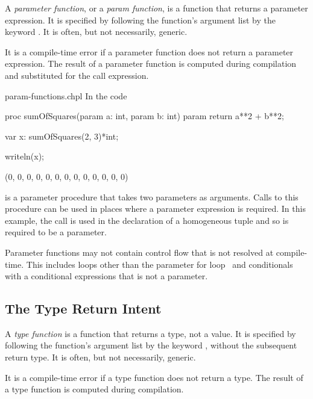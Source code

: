 A \emph{parameter function}, or a \emph{param function}, is a function that
returns a parameter expression.  It is specified by following the function's
argument list by the keyword .  It is often, but not necessarily,
generic.

It is a compile-time error if a parameter function does not return a
parameter expression.  The result of a parameter function is computed
during compilation and substituted for the call expression.

\begin{chapelexample}{param-functions.chpl}
In the code
\begin{chapel}
proc sumOfSquares(param a: int, param b: int) param
  return a**2 + b**2;

var x: sumOfSquares(2, 3)*int;
\end{chapel}
\begin{chapelpost}
writeln(x);
\end{chapelpost}
\begin{chapeloutput}
(0, 0, 0, 0, 0, 0, 0, 0, 0, 0, 0, 0, 0)
\end{chapeloutput}
 is a parameter procedure that takes
two parameters as arguments.  Calls to this procedure can be used in
places where a parameter expression is required.  In this example, the
call is used in the declaration of a homogeneous tuple and so is
required to be a parameter.
\end{chapelexample}

Parameter functions may not contain control flow that is not resolved
at compile-time.  This includes loops other than the parameter for
loop~ and conditionals with a conditional
expressions that is not a parameter.


\subsection{The Type Return Intent}
\label{Type_Return_Intent}

A \emph{type function} is a function that returns a type, not a value.  It is
specified by following the function's argument list by the keyword ,
without the subsequent return type.  It is often, but not necessarily, generic.

It is a compile-time error if a type function does not return a type.
The result of a type function is computed during compilation.


